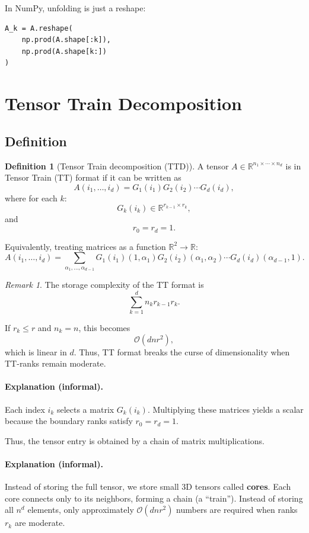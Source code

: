 \documentclass[11pt,a4paper,parskip=half-]{scrartcl}
\theoremstyle{definition}
\newtheorem{definition}{Definition}[section]
\theoremstyle{plain}
\theoremstyle{remark}
\newtheorem{remark}{Remark}[section]
\newcommand{\R}{\mathbb{R}}
\begin{document}
In NumPy, unfolding is just a reshape:

\begin{verbatim}
A_k = A.reshape(
    np.prod(A.shape[:k]),
    np.prod(A.shape[k:])
)
\end{verbatim}

\section{Tensor Train Decomposition}

\subsection{Definition}
\begin{definition}[Tensor Train decomposition (TTD)]
  A tensor $A \in \mathbb{R}^{n_1 \times \cdots \times n_d}$
  is in Tensor Train (TT) format if it can be written as
  \[
    A(i_1,\dots,i_d)
    =
    G_1(i_1) G_2(i_2) \cdots G_d(i_d),
  \]
  where for each $k$:
  \[
    G_k(i_k) \in \mathbb{R}^{r_{k-1} \times r_k},
  \]
  and
  \[
    r_0 = r_d = 1.
  \]

  Equivalently, treating matrices as a function \(\R^2\to \R\):
  \[
    A(i_1,\dots,i_d)
    =
    \sum_{\alpha_1,\dots,\alpha_{d-1}}
    G_1(i_1)(1,\alpha_1)
    G_2(i_2)(\alpha_1,\alpha_2)
    \cdots
    G_d(i_d)(\alpha_{d-1},1).
  \]
\end{definition}

\begin{remark}
  The storage complexity of the TT format is
  \[
    \sum_{k=1}^d n_k r_{k-1} r_k.
  \]

  If $r_k \le r$ and $n_k = n$,
  this becomes
  \[
    \mathcal{O}(d n r^2),
  \]
  which is linear in $d$. Thus, TT format breaks the curse of dimensionality
  when TT-ranks remain moderate.
\end{remark}

\paragraph{Explanation (informal).}
Each index $i_k$ selects a matrix $G_k(i_k)$. Multiplying these matrices yields
a scalar because the boundary ranks satisfy $r_0 = r_d = 1$.

Thus, the tensor entry is obtained by a chain of matrix multiplications.

\paragraph{Explanation (informal).}
Instead of storing the full tensor, we store small 3D tensors called
\textbf{cores}. Each core connects only to its neighbors, forming a chain (a
``train''). Instead of storing all $n^d$ elements, only approximately
$\mathcal{O}(d n r^2)$ numbers are required when ranks $r_k$ are
moderate\cite{Oseledets2011TT}.
\end{document}
